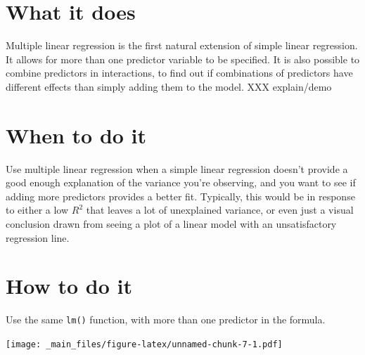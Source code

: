 \documentclass[
]{book}
\newenvironment{Shaded}{\begin{snugshade}}{\end{snugshade}}
\newcommand{\AttributeTok}[1]{\textcolor[rgb]{0.77,0.63,0.00}{#1}}
\newcommand{\DecValTok}[1]{\textcolor[rgb]{0.00,0.00,0.81}{#1}}
\newcommand{\FunctionTok}[1]{\textcolor[rgb]{0.00,0.00,0.00}{#1}}
\newcommand{\NormalTok}[1]{#1}
\newcommand{\OtherTok}[1]{\textcolor[rgb]{0.56,0.35,0.01}{#1}}
\newcommand{\SpecialCharTok}[1]{\textcolor[rgb]{0.00,0.00,0.00}{#1}}
\newcommand{\StringTok}[1]{\textcolor[rgb]{0.31,0.60,0.02}{#1}}
\begin{document}
\hypertarget{what-it-does-1}{%
\section{What it does}\label{what-it-does-1}}

Multiple linear regression is the first natural extension of simple linear regression. It allows for more than one predictor variable to be specified. It is also possible to combine predictors in interactions, to find out if combinations of predictors have different effects than simply adding them to the model. XXX explain/demo

\hypertarget{when-to-do-it-1}{%
\section{When to do it}\label{when-to-do-it-1}}

Use multiple linear regression when a simple linear regression doesn't provide a good enough explanation of the variance you're observing, and you want to see if adding more predictors provides a better fit. Typically, this would be in response to either a low \(R^2\) that leaves a lot of unexplained variance, or even just a visual conclusion drawn from seeing a plot of a linear model with an unsatisfactory regression line.

\hypertarget{how-to-do-it-1}{%
\section{How to do it}\label{how-to-do-it-1}}

Use the same \texttt{lm()} function, with more than one predictor in the formula.

\begin{Shaded}
\end{Shaded}

\texttt{[image: \_main\_files/figure-latex/unnamed-chunk-7-1.pdf]}
\end{document}
